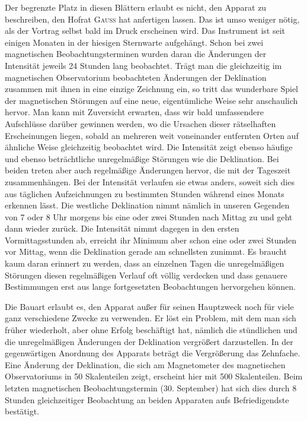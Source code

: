 Der begrenzte Platz in diesen Blättern erlaubt es nicht, den Apparat zu beschreiben, den Hofrat \textsc{Gauss} hat anfertigen lassen. Das ist umso weniger nötig, als der Vortrag selbst bald im Druck erscheinen wird. Das Instrument ist seit einigen Monaten in der hiesigen Sternwarte aufgehängt. Schon bei zwei magnetischen Beobachtungsterminen wurden daran die Änderungen der Intensität jeweils 24 Stunden lang beobachtet. Trägt man die gleichzeitig im magnetischen Observatorium beobachteten Änderungen der Deklination zusammen mit ihnen in eine einzige Zeichnung ein, so tritt das wunderbare Spiel der magnetischen Störungen auf eine neue, eigentümliche Weise sehr anschaulich hervor. Man kann mit Zuversicht erwarten, dass wir bald umfassendere Aufschlüsse darüber gewinnen werden, wo die Ursachen dieser rätselhaften Erscheinungen liegen, sobald an mehreren weit voneinander entfernten Orten auf ähnliche Weise gleichzeitig beobachtet wird. Die Intensität zeigt ebenso häufige und ebenso beträchtliche unregelmäßige Störungen wie die Deklination. Bei beiden treten aber auch regelmäßige Änderungen hervor, die mit der Tageszeit zusammenhängen. Bei der Intensität verlaufen sie etwas anders, soweit sich dies aus täglichen Aufzeichnungen zu bestimmten Stunden während eines Monats erkennen lässt. Die westliche Deklination nimmt nämlich in unseren Gegenden von 7 oder 8 Uhr morgens bis eine oder zwei Stunden nach Mittag zu und geht dann wieder zurück. Die Intensität nimmt dagegen in den ersten Vormittagsstunden ab, erreicht ihr Minimum aber schon eine oder zwei Stunden vor Mittag, wenn die Deklination gerade am schnellsten zunimmt. Es braucht kaum daran erinnert zu werden, dass an einzelnen Tagen die unregelmäßigen Störungen diesen regelmäßigen Verlauf oft völlig verdecken und dass genauere Bestimmungen erst aus lange fortgesetzten Beobachtungen hervorgehen können.

Die Bauart erlaubt es, den Apparat außer für seinen Hauptzweck noch für viele ganz verschiedene Zwecke zu verwenden. Er löst ein Problem, mit dem man sich früher wiederholt, aber ohne Erfolg beschäftigt hat, nämlich die stündlichen und die unregelmäßigen Änderungen der Deklination vergrößert darzustellen. In der gegenwärtigen Anordnung des Apparats beträgt die Vergrößerung das Zehnfache. Eine Änderung der Deklination, die sich am Magnetometer des magnetischen Observatoriums in 50 Skalenteilen zeigt, erscheint hier mit 500 Skalenteilen. Beim letzten magnetischen Beobachtungstermin (30. September) hat sich dies durch 8 Stunden gleichzeitiger Beobachtung an beiden Apparaten aufs Befriedigendste bestätigt.

